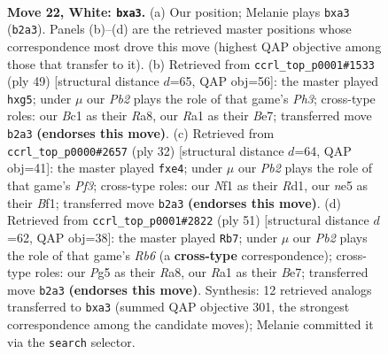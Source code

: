 \documentclass[11pt]{article}
\begin{document}
\clearpage

\begin{figure}[p]\centering
\begin{subfigure}{0.46\textwidth}\centering
\resizebox{\linewidth}{!}{%
\newchessgame
\chessboard[
  setfen={r1b1kb1r/5p2/4p3/p3n1P1/3p3p/p7/1PK3PP/R1B2NNR w kq - 0 22},
  showmover=false,
  pgfstyle=straightmove, color=movearrow, markmove={b2-a3}
]}
\caption{}
\end{subfigure}\hfill
\begin{subfigure}{0.46\textwidth}\centering
\resizebox{\linewidth}{!}{%
\newchessgame
\chessboard[
  setfen={r5k1/p1r1bp2/4p2p/3pn1P1/P7/1PP5/4BPP1/1RB2RK1 b - - 0 25},
  showmover=false,
  pgfstyle=straightmove, color=movearrow, markmove={h6-g5}
]}
\caption{}
\end{subfigure}
\\[4pt]
\begin{subfigure}{0.46\textwidth}\centering
\resizebox{\linewidth}{!}{%
\newchessgame
\chessboard[
  setfen={rn2k2r/pp3p2/2p1b3/6pp/3Pp3/P1P2PP1/6P1/2KR1BNR w kq - 0 17},
  showmover=false,
  pgfstyle=straightmove, color=movearrow, markmove={f3-e4}
]}
\caption{}
\end{subfigure}\hfill
\begin{subfigure}{0.46\textwidth}\centering
\resizebox{\linewidth}{!}{%
\newchessgame
\chessboard[
  setfen={r4k2/4bp1p/2Rp2p1/p2n4/P2P4/1r3N1P/RP3PP1/4BK2 b - - 9 26},
  showmover=false,
  pgfstyle=straightmove, color=movearrow, markmove={b3-b7}
]}
\caption{}
\end{subfigure}
\caption{\textbf{Move 22, White: \texttt{bxa3}.} (a) Our position; Melanie plays \texttt{bxa3} (\texttt{b2a3}). Panels (b)--(d) are the retrieved master positions whose correspondence most drove this move (highest QAP objective among those that transfer to it). (b) Retrieved from \texttt{ccrl\_top\_p0001\#1533} (ply 49) [structural distance $d$=65, QAP obj=56]: the master played \texttt{hxg5}; under $\mu$ our \emph{Pb2} plays the role of that game's \emph{Ph3}; cross-type roles: our \emph{B}c1 as their \emph{R}a8, our \emph{R}a1 as their \emph{B}e7; transferred move \texttt{b2a3} \textbf{(endorses this move)}. (c) Retrieved from \texttt{ccrl\_top\_p0000\#2657} (ply 32) [structural distance $d$=64, QAP obj=41]: the master played \texttt{fxe4}; under $\mu$ our \emph{Pb2} plays the role of that game's \emph{Pf3}; cross-type roles: our \emph{N}f1 as their \emph{R}d1, our \emph{n}e5 as their \emph{B}f1; transferred move \texttt{b2a3} \textbf{(endorses this move)}. (d) Retrieved from \texttt{ccrl\_top\_p0001\#2822} (ply 51) [structural distance $d$=62, QAP obj=38]: the master played \texttt{Rb7}; under $\mu$ our \emph{Pb2} plays the role of that game's \emph{Rb6} (a \textbf{cross-type} correspondence); cross-type roles: our \emph{P}g5 as their \emph{R}a8, our \emph{R}a1 as their \emph{B}e7; transferred move \texttt{b2a3} \textbf{(endorses this move)}. Synthesis: 12 retrieved analogs transferred to \texttt{bxa3} (summed QAP objective 301, the strongest correspondence among the candidate moves); Melanie committed it via the \texttt{search} selector.}
\label{fig:thought-m42}
\end{figure}
\end{document}
